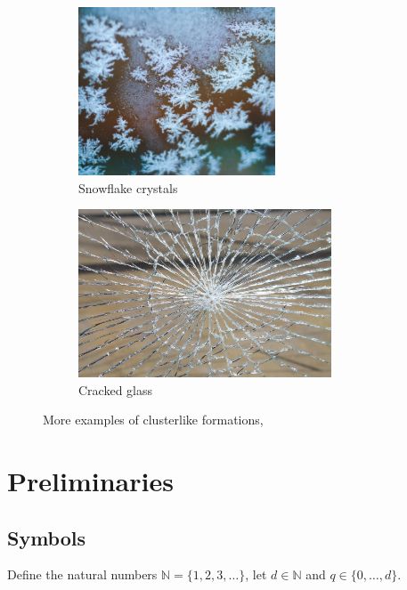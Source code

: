 \documentclass[12pt,a4paper]{scrartcl}
\newcommand{\N}{\mathbb{N}} %
\newcommand{\1}{\mathbbm{1}}
\theoremstyle{definition}
\numberwithin{equation}{section}
\begin{document}
\vspace*{\fill}

\begin{figure}[h!]
	\centering
	\begin{subfigure}[b]{.45\textwidth}
		\centerline{\includegraphics[height=5cm]{images/snowflake.png}}
		\caption{Snowflake crystals} 
	\end{subfigure}
	\begin{subfigure}[b]{.52\textwidth}
		\centerline{\includegraphics[height=5cm]{images/glass-break.jpg}}
		\caption{Cracked glass} 
	\end{subfigure}
	\caption{More examples of clusterlike formations, \cite{unsplash}}
	\label{other}
\end{figure}


\section{Preliminaries} \label{prelim}

\subsection{Symbols} \label{symbols}
Define the natural numbers $\N = \{1,2,3,\dots\}$, let $d\in \N$ and $q\in \{0,\dots,d\}$. 
\end{document}
